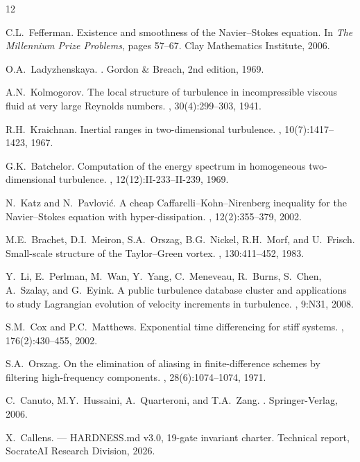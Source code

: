 \documentclass[11pt,a4paper,twoside]{article}
\begin{document}

\begin{thebibliography}{12}

C.L.~Fefferman.
\newblock Existence and smoothness of the {Navier--Stokes} equation.
\newblock In {\em The Millennium Prize Problems}, pages 57--67. Clay Mathematics Institute, 2006.

O.A.~Ladyzhenskaya.
.
\newblock Gordon \& Breach, 2nd edition, 1969.

A.N.~Kolmogorov.
\newblock The local structure of turbulence in incompressible viscous fluid at very large {R}eynolds numbers.
, 30(4):299--303, 1941.

R.H.~Kraichnan.
\newblock Inertial ranges in two-dimensional turbulence.
, 10(7):1417--1423, 1967.

G.K.~Batchelor.
\newblock Computation of the energy spectrum in homogeneous two-dimensional turbulence.
, 12(12):II-233--II-239, 1969.

N.~Katz and N.~Pavlovi\'c.
\newblock A cheap {Caffarelli--Kohn--Nirenberg} inequality for the {Navier--Stokes} equation with hyper-dissipation.
, 12(2):355--379, 2002.

M.E.~Brachet, D.I.~Meiron, S.A.~Orszag, B.G.~Nickel, R.H.~Morf, and U.~Frisch.
\newblock Small-scale structure of the {T}aylor--{G}reen vortex.
, 130:411--452, 1983.

Y.~Li, E.~Perlman, M.~Wan, Y.~Yang, C.~Meneveau, R.~Burns, S.~Chen, A.~Szalay, and G.~Eyink.
\newblock A public turbulence database cluster and applications to study {L}agrangian evolution of velocity increments in turbulence.
, 9:N31, 2008.

S.M.~Cox and P.C.~Matthews.
\newblock Exponential time differencing for stiff systems.
, 176(2):430--455, 2002.

S.A.~Orszag.
\newblock On the elimination of aliasing in finite-difference schemes by filtering high-frequency components.
, 28(6):1074--1074, 1971.

C.~Canuto, M.Y.~Hussaini, A.~Quarteroni, and T.A.~Zang.
.
\newblock Springer-Verlag, 2006.

X.~Callens.
 --- {HARDNESS.md} v3.0, 19-gate invariant charter.
\newblock Technical report, SocrateAI Research Division, 2026.

\end{thebibliography}
\end{document}
